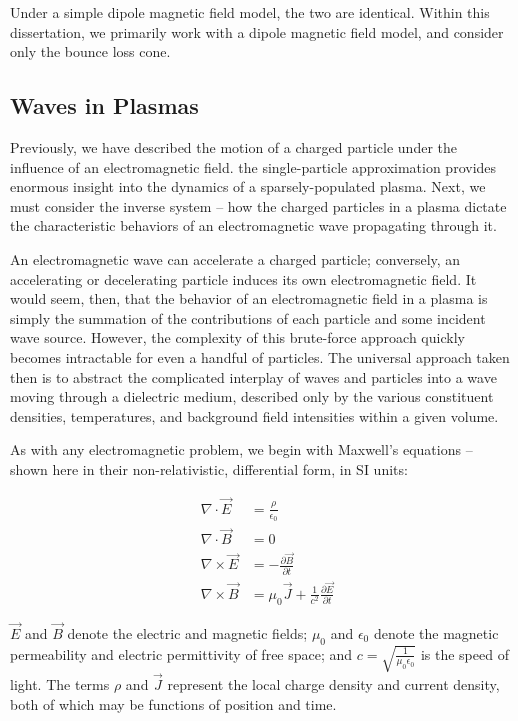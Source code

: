 Under a simple dipole magnetic field model, the two are identical. Within this dissertation, we primarily work with a dipole magnetic field model, and consider only the bounce loss cone.

\subsection{Waves in Plasmas}
Previously, we have described the motion of a charged particle under the influence of an electromagnetic field. the single-particle approximation provides enormous insight into the dynamics of a sparsely-populated plasma. Next, we must consider the inverse system -- how the charged particles in a plasma dictate the characteristic behaviors of an electromagnetic wave propagating through it.

An electromagnetic wave can accelerate a charged particle; conversely, an accelerating or decelerating particle induces its own electromagnetic field. It would seem, then, that the behavior of an electromagnetic field in a plasma is simply the summation of the contributions of each particle and some incident wave source. However, the complexity of this brute-force approach quickly becomes intractable for even a handful of particles. The universal approach taken then is to abstract the complicated interplay of waves and particles into a wave moving through a dielectric medium, described only by the various constituent densities, temperatures, and background field intensities within a given volume. 

As with any electromagnetic problem, we begin with Maxwell's equations -- shown here in their non-relativistic, differential form, in SI units:

\begin{eqnarray}
&\nabla \cdot \vec{E}& = \frac{\rho}{\epsilon_0} \label{eqn:maxwell1}\\
&\nabla \cdot \vec{B}& = 0 \label{eqn:maxwell2}\\
&\nabla \times \vec{E}& = -\frac{\partial \vec{B}}{\partial t} \label{eqn:maxwell3}\\
&\nabla \times \vec{B}& = \mu_0 \vec{J} + \frac{1}{c^2}\frac{\partial \vec{E}}{\partial t} \label{eqn:maxwell4}
\end{eqnarray}

$\vec{E}$ and $\vec{B}$ denote the electric and magnetic fields; $\mu_0$ and $\epsilon_0$ denote the magnetic permeability and electric permittivity of free space; and $c=\sqrt{\frac{1}{\mu_0\epsilon_0}}$ is the speed of light. The terms $\rho$ and $\vec{J}$ represent the local charge density and current density, both of which may be functions of position and time.

